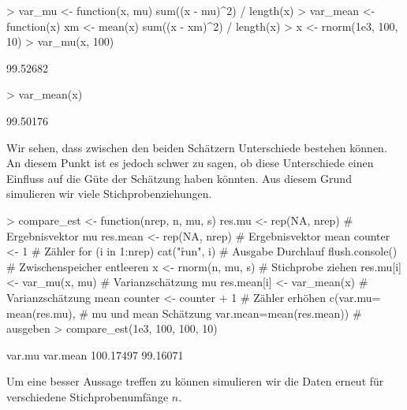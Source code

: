 \begin{Schunk}
\begin{Sinput}
> var_mu <- function(x, mu){   
   sum((x - mu)^2) / length(x)  
 }   
> var_mean <- function(x){
   xm <- mean(x)
   sum((x - xm)^2) / length(x)
 }
> x <- rnorm(1e3, 100, 10)
> var_mu(x, 100)  
\end{Sinput}
\begin{Soutput}
[1] 99.52682
\end{Soutput}
\begin{Sinput}
> var_mean(x)
\end{Sinput}
\begin{Soutput}
[1] 99.50176
\end{Soutput}
\end{Schunk}

Wir sehen, dass zwischen den beiden Schätzern Unterschiede bestehen können. An diesem Punkt ist es jedoch schwer zu sagen, ob diese Unterschiede einen Einfluss auf die Güte der Schätzung haben könnten. Aus diesem Grund simulieren wir viele Stichprobenziehungen.

\begin{Schunk}
\begin{Sinput}
> compare_est <- function(nrep, n, mu, s){
   res.mu <- rep(NA, nrep)         # Ergebnisvektor mu
   res.mean <- rep(NA, nrep)       # Ergebnisvektor mean
   counter <- 1                    # Zähler
   for (i in 1:nrep){
     cat("\r run", i)              # Ausgabe Durchlauf
     flush.console()               # Zwischenspeicher entleeren
     x <- rnorm(n, mu, s)          # Stichprobe ziehen
     res.mu[i] <- var_mu(x, mu)    # Varianzschätzung mu
     res.mean[i] <- var_mean(x)    # Varianzschätzung mean
     counter <- counter + 1        # Zähler erhöhen 
   }
   c(var.mu= mean(res.mu),         # mu und mean Schätzung
     var.mean=mean(res.mean))      # ausgeben
 }
> compare_est(1e3, 100, 100, 10)
\end{Sinput}
\end{Schunk}

\begin{Schunk}
\begin{Soutput}
   var.mu  var.mean 
100.17497  99.16071 
\end{Soutput}
\end{Schunk}

Um eine besser Aussage treffen zu können simulieren wir die Daten erneut für verschiedene Stichprobenumfänge $n$.

